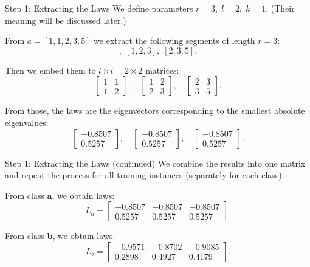 \documentclass{beamer}
\begin{document}
\begin{frame}{Step 1: Extracting the Laws}
  We define parameters \( r = 3, \; l = 2, \; k = 1 \). {\color{gray}(Their meaning will be discussed later.)}

  From \( a = [1, 1, 2, 3, 5] \) we extract the following segments of length \( r = 3 \):
  \begin{equation}
    [1, 1, 2], \; [1, 2, 3], \; [2, 3, 5].
  \end{equation}

  Then we embed them to \( l \times l = 2 \times 2 \) matrices:
  \begin{equation}
    \begin{bmatrix} 1 & 1 \\ 1 & 2 \end{bmatrix}, \quad
    \begin{bmatrix} 1 & 2 \\ 2 & 3 \end{bmatrix}, \quad
    \begin{bmatrix} 2 & 3 \\ 3 & 5 \end{bmatrix}.
  \end{equation}

  From those, the laws are the eigenvectors corresponding to the smallest absolute eigenvalues:
  \begin{equation}
    \begin{bmatrix} -0.8507 \\ 0.5257 \end{bmatrix}, \quad
    \begin{bmatrix} -0.8507 \\ 0.5257 \end{bmatrix}, \quad
    \begin{bmatrix} -0.8507 \\ 0.5257 \end{bmatrix}.
  \end{equation}
\end{frame}

\begin{frame}{Step 1: Extracting the Laws (continued)}
  We combine the results into one matrix and repeat the process for all training instances (separately for each class).

  From class \textbf{a}, we obtain laws:
  \begin{equation}
    L_a = \begin{bmatrix} -0.8507 & -0.8507 & -0.8507 \\ 0.5257 & 0.5257 & 0.5257 \end{bmatrix}.
  \end{equation}

  From class \textbf{b}, we obtain laws:
  \begin{equation}
    L_b = \begin{bmatrix} -0.9571 & -0.8702 & -0.9085 \\ 0.2898 & 0.4927 & 0.4179 \end{bmatrix}.
  \end{equation}
\end{frame}
\end{document}
